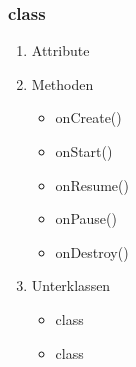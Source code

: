 \documentclass[a4paper]{scrreprt}
\begin{document}
                \subsubsection{class }
                \begin{enumerate}
                        \item Attribute
                        \item Methoden
                            \begin{itemize}
                                \item onCreate()
                                \item onStart()
                                \item onResume()
                                \item onPause()
                                \item onDestroy()
                            \end{itemize}
                        \item Unterklassen
                            \begin{itemize}
                                \item class 
                                \item class 
                            \end{itemize}
                                
                \end{enumerate}
\end{document}
